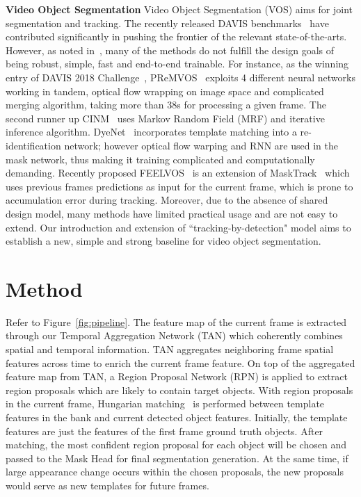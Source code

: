 \documentclass[10pt,twocolumn,letterpaper]{article}
\begin{document}
\textbf{Video Object Segmentation}
Video Object Segmentation (VOS) aims for joint segmentation and tracking. The recently released DAVIS benchmarks~\cite{perazzi2016davis, pont2017davis, caelles2018davis} have contributed significantly in pushing the frontier of the relevant state-of-the-arts. However, as noted in~\cite{voigtlaender2019feelvos}, many of the methods do not fulfill the design goals of being robust, simple, fast and end-to-end trainable.
For instance, as the winning entry of DAVIS 2018 Challenge~\cite{caelles2018davis}, PReMVOS~\cite{luiten2018premvos} exploits 4 different neural networks working in tandem, optical flow wrapping on image space and complicated merging algorithm, taking more than 38s for processing a given frame.
The second runner up CINM~\cite{bao2018cnn} uses Markov Random Field (MRF) and iterative inference algorithm.
DyeNet~\cite{xiao2018jointreid} incorporates template matching into a re-identification network; however optical flow warping and RNN are used in the mask network, thus making it training complicated and computationally demanding.
Recently proposed FEELVOS~\cite{voigtlaender2019feelvos} is an extension of MaskTrack~\cite{perazzi2017masktrack} which uses previous frames predictions as input for the current frame,
which is prone to accumulation error during tracking.
Moreover, due to the absence of shared design model, many methods have limited practical usage and are not easy to extend.
Our introduction and extension of ``tracking-by-detection" model aims to establish a new, simple and strong baseline for video object segmentation.


\section{Method}

Refer to Figure~\ref{fig:pipeline}.
The feature map of the current frame is extracted through our Temporal Aggregation Network (TAN) which coherently combines spatial and temporal information. TAN aggregates neighboring frame spatial features across time to enrich the current frame feature.
On top of the aggregated feature map from TAN, a Region Proposal Network (RPN) is applied to extract region proposals which are likely to contain target objects.
With region proposals in the current frame, Hungarian matching~\cite{munkres1957algorithms} is performed between template features in the bank and current detected object features. Initially, the template features are just the features of the first frame ground truth objects.
After matching, the most confident region proposal for each object will be chosen and passed to the Mask Head for final segmentation generation. At the same time, if large appearance change occurs within the chosen proposals, the new proposals would serve as new templates for future frames.
\end{document}
